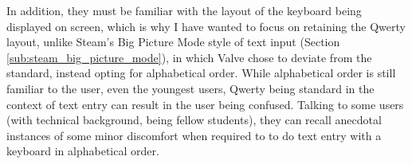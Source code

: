\documentclass[requirements.tex]{subfiles}
\begin{document}
In addition, they must be familiar with the layout of the keyboard being
displayed on screen, which is why I have wanted to focus on retaining the Qwerty
layout, unlike Steam's Big Picture Mode style of text input (Section
\ref{sub:steam_big_picture_mode}), in which Valve chose to deviate from the 
standard, instead opting for alphabetical order. While alphabetical order is
still familiar to the user, even the youngest users, Qwerty being standard in
the context of text entry can result in the user being confused. Talking to
some users (with technical background, being fellow students), they can recall
anecdotal instances of some minor discomfort when required to to do text entry
with a keyboard in alphabetical order.
\end{document}
